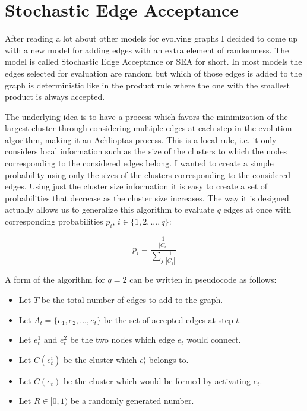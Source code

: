 \section{Stochastic Edge Acceptance}
After reading a lot about other models for evolving graphs I decided to come up with a new model for adding edges with an extra element of randomness.
The model is called Stochastic Edge Acceptance or SEA for short.
In most models the edges selected for evaluation are random but which of those edges is added to the graph is deterministic like in the product rule where the one with the smallest product is always accepted.

The underlying idea is to have a process which favors the minimization of the largest cluster through considering multiple edges at each step in the evolution algorithm, making it an Achlioptas process.
This is a local rule, i.e. it only considers local information such as the size of the clusters to which the nodes corresponding to the considered edges belong.
I wanted to create a simple probability using only the sizes of the clusters corresponding to the considered edges.
Using just the cluster size information it is easy to create a set of probabilities that decrease as the cluster size increases.
The way it is designed actually allows us to generalize this algorithm to evaluate $q$ edges at once with corresponding probabilities $p_i$, $i \in \{1, 2, ..., q\}$:

\begin{equation}
	p_i = \frac{\frac{1}{|C_i|}}{\sum_j \frac{1}{|C_j|}}
\end{equation}

A form of the algorithm for $q = 2$ can be written in pseudocode as follows:
\begin{itemize}
	\item Let $T$ be the total number of edges to add to the graph.
	\item Let $A_t = \{e_1, e_2, ..., e_t\}$ be the set of accepted edges at step $t$.
	\item Let $e_t^1$ and $e_t^2$ be the two nodes which edge $e_t$ would connect.
	\item Let $C(e_t^i)$ be the cluster which $e_t^i$ belongs to.
	\item Let $C(e_t)$ be the cluster which would be formed by activating $e_t$.
	\item Let $R \in [0, 1)$ be a randomly generated number.
\end{itemize}

